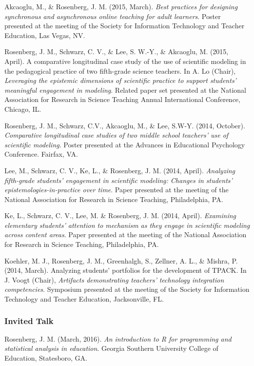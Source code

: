 \documentclass[]{article}
\begin{document}
Akcaoglu, M., \& Rosenberg, J. M. (2015, March). \emph{Best practices
for designing synchronous and asynchronous online teaching for adult
learners}. Poster presented at the meeting of the Society for
Information Technology and Teacher Education, Las Vegas, NV.

Rosenberg, J. M., Schwarz, C. V., \& Lee, S. W.-Y., \& Akcaoglu, M.
(2015, April). A comparative longitudinal case study of the use of
scientific modeling in the pedagogical practice of two fifth-grade
science teachers. In A. Lo (Chair), \emph{Leveraging the epistemic
dimensions of scientific practice to support students' meaningful
engagement in modeling}. Related paper set presented at the National
Association for Research in Science Teaching Annual International
Conference, Chicago, IL.

Rosenberg, J. M., Schwarz, C.V., Akcaoglu, M., \& Lee, S.W-Y. (2014,
October). \emph{Comparative longitudinal case studies of two middle
school teachers' use of scientific modeling}. Poster presented at the
Advances in Educational Psychology Conference. Fairfax, VA.

Lee, M., Schwarz, C. V., Ke, L., \& Rosenberg, J. M. (2014, April).
\emph{Analyzing fifth-grade students' engagement in scientific modeling:
Changes in students' epistemologies-in-practice over time}. Paper
presented at the meeting of the National Association for Research in
Science Teaching, Philadelphia, PA.

Ke, L., Schwarz, C. V., Lee, M. \& Rosenberg, J. M. (2014, April).
\emph{Examining elementary students' attention to mechanism as they
engage in scientific modeling across content areas}. Paper presented at
the meeting of the National Association for Research in Science
Teaching, Philadelphia, PA.

Koehler, M. J., Rosenberg, J. M., Greenhalgh, S., Zellner, A. L., \&
Mishra, P. (2014, March). Analyzing students' portfolios for the
development of TPACK. In J. Voogt (Chair), \emph{Artifacts demonstrating
teachers' technology integration competencies}. Symposium presented at
the meeting of the Society for Information Technology and Teacher
Education, Jacksonville, FL.

\subsubsection{Invited Talk}\label{invited-talk}

Rosenberg, J. M. (March, 2016). \emph{An introduction to R for
programming and statistical analysis in education}. Georgia Southern
University College of Education, Statesboro, GA.
\end{document}
